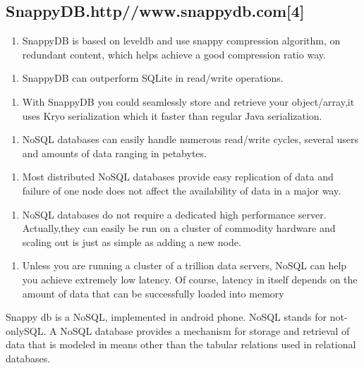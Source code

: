 \documentclass[12pt, a4paper]{article}
\begin{document}
\subsection{SnappyDB.http//www.snappydb.com[4]}
\vspace{5mm}
\begin{enumerate}
\item SnappyDB is based on leveldb and use snappy compression algorithm, on   
redundant content, which helps achieve a good compression ratio way.
\end{enumerate}
\begin{enumerate}
\item SnappyDB can outperform SQLite in read/write operations.
\end{enumerate}
\begin{enumerate}
\item With SnappyDB you could seamlessly store and retrieve your object/array,it uses Kryo serialization which it faster than regular Java serialization.
\end{enumerate}
\begin{enumerate}
\item NoSQL databases can easily handle numerous read/write cycles, several 
users and amounts of data ranging in petabytes.
\end{enumerate}
\begin{enumerate}
\item Most distributed NoSQL databases provide easy replication of data and failure of one node does not affect the availability of data in a major way.
\end{enumerate}
\begin{enumerate}
\item NoSQL databases do not require a dedicated high performance server. Actually,they can easily be run on a cluster of commodity hardware and scaling out is just as simple as adding a new node.
\end{enumerate}
\begin{enumerate}
\item Unless you are running a cluster of a trillion data servers, NoSQL can help you achieve extremely low latency. Of course, latency in itself depends on the amount of data that can be successfully loaded into memory
\end{enumerate}
Snappy db is a NoSQL, implemented in android phone. NoSQL stands for not-onlySQL. A NoSQL database provides a mechanism for storage and retrieval of data that is modeled in means other than the tabular relations used in relational databases.
\end{document}
